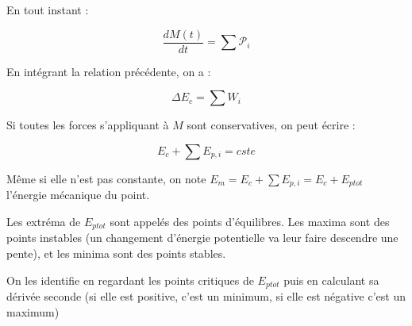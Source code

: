 \documentclass[a4paper,12pt]{book}
\newcommand{\Thr}[2]{\begin{tcolorbox}[sharp corners, colback=white,colframe=red!10!blue!30!green!75!, title=Théorème : #1]#2\end{tcolorbox}}
\begin{document}
\Thr{Théorème de la puissance mécanique TPM}{En tout instant :
\par $$\dfrac{d M(t)}{dt} = \sum \mathcal{P}_i$$}
\Thr{Théorème de l'énergie cinétique TEC}{En intégrant la relation précédente, on a :
\par $$\Delta E_c = \sum W_i$$}
\Thr{Conservation de l'énergie mécanique TEM}{Si toutes les forces s'appliquant à $M$ sont conservatives, on peut écrire :
\par $$E_c + \sum E_{p,i} = cste$$
\par Même si elle n'est pas constante, on note $E_m =E_c + \sum E_{p,i} = E_c + E_{ptot}$ l'énergie mécanique du point.
\par Les extréma de $E_{ptot}$ sont appelés des points d'équilibres. Les maxima sont des points instables (un changement d'énergie potentielle va leur faire descendre une pente), et les minima sont des points stables.
\par On les identifie en regardant les points critiques de $E_{ptot}$ puis en calculant sa dérivée seconde (si elle est positive, c'est un minimum, si elle est négative c'est un maximum)}
\end{document}
